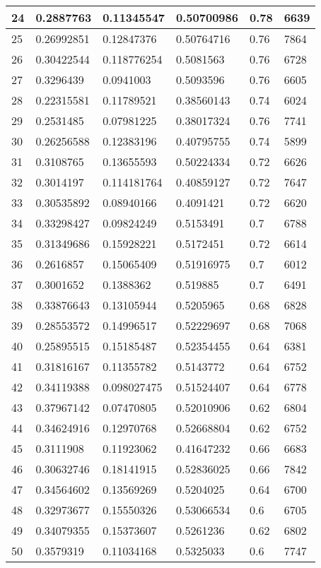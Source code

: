 \begin{longtable}{|l|l|l|l|l|l|}
24 & 0.2887763 & 0.11345547 & 0.50700986 & 0.78 & 6639 \\ \hline 
25 & 0.26992851 & 0.12847376 & 0.50764716 & 0.76 & 7864 \\ \hline 
26 & 0.30422544 & 0.118776254 & 0.5081563 & 0.76 & 6728 \\ \hline 
27 & 0.3296439 & 0.0941003 & 0.5093596 & 0.76 & 6605 \\ \hline 
28 & 0.22315581 & 0.11789521 & 0.38560143 & 0.74 & 6024 \\ \hline 
29 & 0.2531485 & 0.07981225 & 0.38017324 & 0.76 & 7741 \\ \hline 
30 & 0.26256588 & 0.12383196 & 0.40795755 & 0.74 & 5899 \\ \hline 
31 & 0.3108765 & 0.13655593 & 0.50224334 & 0.72 & 6626 \\ \hline 
32 & 0.3014197 & 0.114181764 & 0.40859127 & 0.72 & 7647 \\ \hline 
33 & 0.30535892 & 0.08940166 & 0.4091421 & 0.72 & 6620 \\ \hline 
34 & 0.33298427 & 0.09824249 & 0.5153491 & 0.7 & 6788 \\ \hline 
35 & 0.31349686 & 0.15928221 & 0.5172451 & 0.72 & 6614 \\ \hline 
36 & 0.2616857 & 0.15065409 & 0.51916975 & 0.7 & 6012 \\ \hline 
37 & 0.3001652 & 0.1388362 & 0.519885 & 0.7 & 6491 \\ \hline 
38 & 0.33876643 & 0.13105944 & 0.5205965 & 0.68 & 6828 \\ \hline 
39 & 0.28553572 & 0.14996517 & 0.52229697 & 0.68 & 7068 \\ \hline 
40 & 0.25895515 & 0.15185487 & 0.52354455 & 0.64 & 6381 \\ \hline 
41 & 0.31816167 & 0.11355782 & 0.5143772 & 0.64 & 6752 \\ \hline 
42 & 0.34119388 & 0.098027475 & 0.51524407 & 0.64 & 6778 \\ \hline 
43 & 0.37967142 & 0.07470805 & 0.52010906 & 0.62 & 6804 \\ \hline 
44 & 0.34624916 & 0.12970768 & 0.52668804 & 0.62 & 6752 \\ \hline 
45 & 0.3111908 & 0.11923062 & 0.41647232 & 0.66 & 6683 \\ \hline 
46 & 0.30632746 & 0.18141915 & 0.52836025 & 0.66 & 7842 \\ \hline 
47 & 0.34564602 & 0.13569269 & 0.5204025 & 0.64 & 6700 \\ \hline 
48 & 0.32973677 & 0.15550326 & 0.53066534 & 0.6 & 6705 \\ \hline 
49 & 0.34079355 & 0.15373607 & 0.5261236 & 0.62 & 6802 \\ \hline 
50 & 0.3579319 & 0.11034168 & 0.5325033 & 0.6 & 7747 \\ \hline 
\end{longtable}